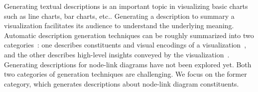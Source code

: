 Generating textual descriptions is an important topic in visualizing basic charts such as line charts, bar charts, etc..
Generating a description to summary a visualization facilitates its audience to understand the underlying meaning.
Automatic description generation techniques can be roughly summarized into two categories~\cite{DBLP:conf/inlg/ObeidH20}: one describes constituents and visual encodings of a visualization~\cite{DBLP:journals/coling/MittalMCR98, DBLP:journals/tochi/FerresLST13}, and the other describes high-level insights conveyed by the visualization~\cite{DBLP:conf/apvis/LiuXHWY20, DBLP:conf/inlg/ObeidH20}.
Generating descriptions for node-link diagrams have not been explored yet.
Both two categories of generation techniques are challenging.
We focus on the former category, which generates descriptions about node-link diagram constituents.


